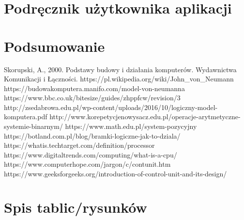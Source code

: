 \documentclass[12pt, a4paper, onside, polish]{article}				%
\begin{document}
\section{Podręcznik użytkownika aplikacji}
\cleardoublepage




\section{Podsumowanie}
\cleardoublepage



\begin{thebibliography}{100}
 Skorupski, A., 2000. Podstawy budowy i działania komputerów. Wydawnictwa Komunikacji i Łączności.
\bibitem{} https://pl.wikipedia.org/wiki/John_von_Neumann 
\bibitem{} https://budowakomputera.manifo.com/model-von-neumanna 
\bibitem{} https://www.bbc.co.uk/bitesize/guides/zhppfcw/revision/3 
\bibitem{} http://zsedabrowa.edu.pl/wp-content/uploads/2016/10/logiczny-model-komputera.pdf 
\bibitem{} http://www.korepetycjenowysacz.edu.pl/operacje-arytmetyczne-systemie-binarnym/
\bibitem{} https://www.math.edu.pl/system-pozycyjny
\bibitem{} https://botland.com.pl/blog/bramki-logiczne-jak-to-dziala/
\bibitem{} https://whatis.techtarget.com/definition/processor
\bibitem{} https://www.digitaltrends.com/computing/what-is-a-cpu/
\bibitem{} https://www.computerhope.com/jargon/c/contunit.htm
\bibitem{} https://www.geeksforgeeks.org/introduction-of-control-unit-and-its-design/

\end{thebibliography}


\cleardoublepage
\section{Spis tablic/rysunków}
\begin{appendix}
\listoftables
\listoffigures
\end{appendix}

\cleardoublepage
\end{document}
